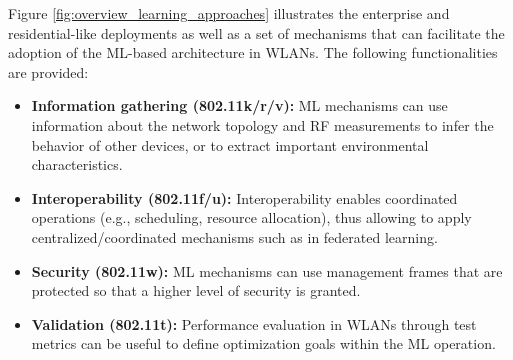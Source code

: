 \documentclass{article}
\begin{document}
Figure \ref{fig:overview_learning_approaches} illustrates the enterprise and residential-like deployments as well as a set of mechanisms that can facilitate the adoption of the ML-based architecture in WLANs. The following functionalities are provided:
\begin{itemize}
	\item \textbf{Information gathering (802.11k/r/v):} ML mechanisms can use information about the network topology and RF measurements to infer the behavior of other devices, or to extract important environmental characteristics.
	\item \textbf{Interoperability (802.11f/u):} Interoperability enables coordinated operations (e.g., scheduling, resource allocation), thus allowing to apply centralized/coordinated mechanisms such as in federated learning.
	\item \textbf{Security (802.11w):} ML mechanisms can use management frames that are protected so that a higher level of security is granted.
	\item \textbf{Validation (802.11t):} Performance evaluation in WLANs through test metrics can be useful to define optimization goals within the ML  operation.
\end{itemize}

\end{document}
